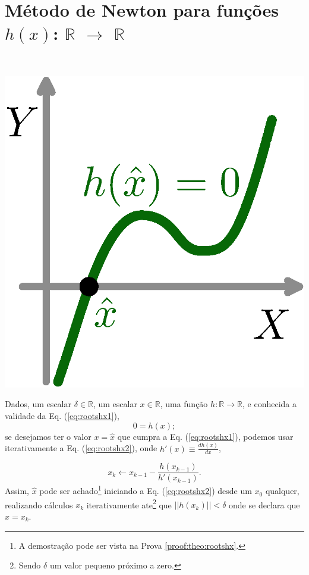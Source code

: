
\section{ Método de Newton para funções $h(x)$: $\mathbb{R}$ $\rightarrow$ $\mathbb{R}$ }

\begin{theorem}\label{theo:rootshx}
~\\
\begin{minipage}{0.2\textwidth}
\centering
\includegraphics[width=0.95\linewidth]{chapters/roots/roots1.eps} 
\end{minipage}
\begin{minipage}{0.8\textwidth}
Dados,
um escalar $\delta \in \mathbb{R}$, 
um escalar $x \in \mathbb{R}$, 
uma função $h:\mathbb{R} \rightarrow \mathbb{R}$, e 
conhecida a validade da Eq. (\ref{eq:rootshx1}),
\begin{equation}\label{eq:rootshx1}
0=h(x);
\end{equation}
se desejamos ter o valor $x=\hat{x}$ que cumpra a Eq. (\ref{eq:rootshx1}),
podemos usar iterativamente a Eq. (\ref{eq:rootshx2}),
onde  $h'(x)\equiv \frac{d h(x)}{d x}$,
\end{minipage}

\begin{equation}\label{eq:rootshx2}
x_{k} \leftarrow x_{k-1}-\frac{ h(x_{k-1})}{h'(x_{k-1})}.
\end{equation}
Assim, $\hat{x}$ pode ser achado\footnote{A 
demostração pode ser vista na Prova \ref{proof:theo:rootshx}.} 
iniciando a Eq. (\ref{eq:rootshx2}) desde um 
$x_{0}$ qualquer, realizando cálculos $x_{k}$ iterativamente  
ate\footnote{Sendo $\delta$ um valor pequeno próximo a zero.} que $||h(x_k)||<\delta$
onde se declara que $\hat{x}=x_k$.


\end{theorem}
